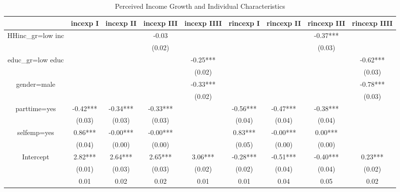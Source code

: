 \documentclass[12pt,notitlepage,onecolumn,aps,pra]{article}
\begin{document}
       
\begin{table}[p]
\centering
\begin{adjustbox}{width={\textwidth}}
\begin{threeparttable}
\caption{Perceived Income Growth and Individual Characteristics}
\label{micro_reg_exp}\begin{tabular}{ccccccccc}
\toprule
{} &  incexp I & incexp II & incexp III & incexp IIII & rincexp I & rincexp II & rincexp III & rincexp IIII \\
\midrule
HHinc\_gr=low inc &           &           &      -0.03 &             &           &            &    -0.37*** &              \\
                 &           &           &     (0.02) &             &           &            &      (0.03) &              \\
educ\_gr=low educ &           &           &            &    -0.25*** &           &            &             &     -0.62*** \\
                 &           &           &            &      (0.02) &           &            &             &       (0.03) \\
gender=male      &           &           &            &    -0.33*** &           &            &             &     -0.78*** \\
                 &           &           &            &      (0.02) &           &            &             &       (0.03) \\
parttime=yes     &  -0.42*** &  -0.34*** &   -0.33*** &             &  -0.56*** &   -0.47*** &    -0.38*** &              \\
                 &    (0.03) &    (0.03) &     (0.03) &             &    (0.04) &     (0.04) &      (0.04) &              \\
selfemp=yes      &   0.86*** &  -0.00*** &   -0.00*** &             &   0.83*** &   -0.00*** &     0.00*** &              \\
                 &    (0.04) &    (0.00) &     (0.00) &             &    (0.05) &     (0.00) &      (0.00) &              \\
Intercept        &   2.82*** &   2.64*** &    2.65*** &     3.06*** &  -0.28*** &   -0.51*** &    -0.40*** &      0.23*** \\
                 &    (0.01) &    (0.03) &     (0.03) &      (0.02) &    (0.02) &     (0.04) &      (0.04) &       (0.02) \\
                 &      0.01 &      0.02 &       0.02 &        0.01 &      0.01 &       0.04 &        0.05 &         0.02 \\

\end{tabular}
\end{threeparttable}
\end{adjustbox}
\end{table}
\end{document}
